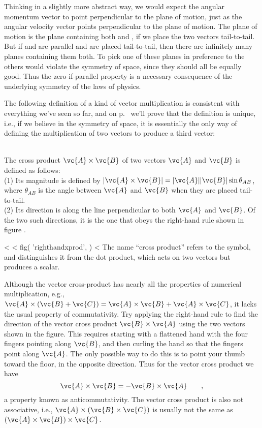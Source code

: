 Thinking in a slightly more abstract way, we would expect
the angular momentum vector to point perpendicular to the
plane of motion, just as the angular velocity vector points
perpendicular to the plane of motion. The plane of motion is
the plane containing both  and , if we place the two
vectors tail-to-tail. But if  and  are parallel and are
placed tail-to-tail, then there are infinitely many planes
containing them both. To pick one of these planes in
preference to the others would violate the symmetry of
space, since they should all be equally good. Thus the
zero-if-parallel property is a necessary consequence of the
underlying symmetry of the laws of physics.

The following definition of a kind of vector multiplication
is consistent with everything we've seen so far, and on p.~\pageref{misc:uniquexproof}
 we'll prove that the definition is unique, i.e., if
we believe in the symmetry of space, it is essentially the
only way of defining the multiplication of two vectors to
produce a third vector:

\enlargethispage{-2\baselineskip}

\\
The cross product $\vc{A}\times\vc{B}$ of two vectors $\vc{A}$ and $\vc{B}$ is defined as
follows:\\
(1) Its magnitude is defined by $|\vc{A}\times\vc{B}| = |\vc{A}| |\vc{B}| \sin\theta_{AB}$,
where $\theta_{AB}$ is the angle between $\vc{A}$ and $\vc{B}$ when they are placed
tail-to-tail.\\
(2) Its direction is along the line perpendicular to both $\vc{A}$ and $\vc{B}$.
Of the two such directions, it is the one that obeys
the right-hand rule shown in  figure .\label{vectorcrossproductdef}

<%
<%
  fig(
    'righthandxprod',
  )
<%
The name ``cross product'' refers to the  symbol, and
distinguishes it from the dot product, which acts on two
vectors but produces a scalar.

Although the vector cross-product has nearly all the
properties of numerical multiplication, e.g.,
 $\vc{A}\times(\vc{B}+\vc{C}) = \vc{A}\times\vc{B}+\vc{A}\times\vc{C}$,
it lacks the usual property of commutativity. Try applying
the right-hand rule to find the direction of the vector
cross product $\vc{B}\times\vc{A}$ using the two vectors shown in the figure.
This requires starting with a flattened hand with the four
fingers pointing along $\vc{B}$, and then curling the hand so that
the fingers point along $\vc{A}$. The only possible way to do this
is to point your thumb toward the floor, in the opposite
direction. Thus for the vector cross product we have
\begin{equation*}
        \vc{A}\times\vc{B} = -\vc{B}\times\vc{A} \qquad  ,
\end{equation*}
a property known as anticommutativity. The vector cross
product is also not associative, i.e.,
 $\vc{A}\times(\vc{B}\times\vc{C})$ is usually not
the same as  $(\vc{A}\times\vc{B})\times\vc{C}$.

